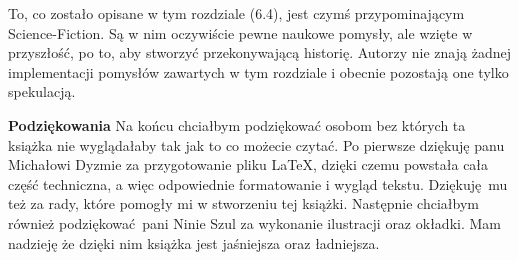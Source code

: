 To, co zostało opisane w tym rozdziale (6.4), jest czymś przypominającym Science-Fiction. Są w nim oczywiście pewne naukowe pomysły, ale wzięte w przyszłość, po to, aby stworzyć przekonywającą historię. Autorzy nie znają żadnej implementacji pomysłów zawartych w tym rozdziale i obecnie pozostają one tylko spekulacją.

\newpage
\noindent
\textbf{Podziękowania}
\newline
Na końcu chciałbym podziękować osobom bez których ta książka nie wyglądałaby tak jak to co możecie czytać. Po pierwsze dziękuję panu Michałowi Dyzmie za przygotowanie pliku LaTeX, dzięki czemu powstała cała część techniczna, a więc odpowiednie formatowanie i wygląd tekstu. Dziękuję mu też za rady, które pomogły mi w stworzeniu tej książki. Następnie chciałbym również podziękować pani Ninie Szul za wykonanie ilustracji oraz okładki. Mam nadzieję że dzięki nim książka jest jaśniejsza oraz ładniejsza.


